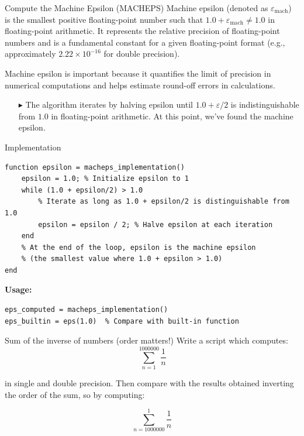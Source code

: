 \documentclass[aspectratio=169]{beamer}
\begin{document}
\begin{frame}{Compute the Machine Epsilon (MACHEPS)}
    Machine epsilon (denoted as $\varepsilon_{\text{mach}}$) is the smallest positive floating-point number such that $1.0 + \varepsilon_{\text{mach}} \neq 1.0$ in floating-point arithmetic. It represents the relative precision of floating-point numbers and is a fundamental constant for a given floating-point format (e.g., approximately $2.22 \times 10^{-16}$ for double precision).
    
    Machine epsilon is important because it quantifies the limit of precision in numerical computations and helps estimate round-off errors in calculations.
    
    \begin{itemize}
        \item[$\blacktriangleright$]
        The algorithm iterates by halving epsilon until $1.0 + \varepsilon/2$ is indistinguishable from $1.0$ in floating-point arithmetic. At this point, we've found the machine epsilon.
    \end{itemize}
\end{frame}

\begin{frame}[fragile]{Implementation}
    \begin{verbatim}
function epsilon = macheps_implementation()
    epsilon = 1.0; % Initialize epsilon to 1
    while (1.0 + epsilon/2) > 1.0
        % Iterate as long as 1.0 + epsilon/2 is distinguishable from 1.0
        epsilon = epsilon / 2; % Halve epsilon at each iteration
    end
    % At the end of the loop, epsilon is the machine epsilon
    % (the smallest value where 1.0 + epsilon > 1.0)
end
    \end{verbatim}
    
    \textbf{Usage:}
    \begin{verbatim}
eps_computed = macheps_implementation()
eps_builtin = eps(1.0)  % Compare with built-in function
    \end{verbatim}
\end{frame}

\begin{frame}{Sum of the inverse of numbers (order matters!)}
    Write a script which computes:
    \begin{equation*}
        \sum_{n = 1}^{1000000}\dfrac{1}{n}
    \end{equation*}

    in \alert{single} and \alert{double} precision. Then compare with the results obtained inverting the order of the sum, so by computing:

    \begin{equation*}
        \sum_{n=1000000}^{1}\dfrac{1}{n}
    \end{equation*}
\end{frame}
\end{document}
